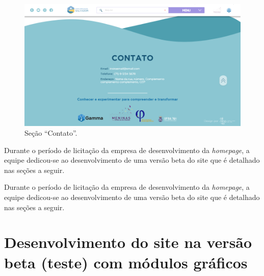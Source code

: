 \documentclass[
]{book}
\begin{document}
\begin{figure}
\includegraphics[width=13.33in]{images/image90} \caption{Seção “Contato”.}\label{fig:contatorecossa}
\end{figure}

Durante o período de licitação da empresa de desenvolvimento da \emph{homepage}, a equipe dedicou-se ao desenvolvimento de uma versão beta do site que é detalhado nas seções a seguir.

Durante o período de licitação da empresa de desenvolvimento da \emph{homepage}, a equipe dedicou-se ao desenvolvimento de uma versão beta do site que é detalhado nas seções a seguir.

\hypertarget{desenvolvimento-do-site-na-versuxe3o-beta-teste-com-muxf3dulos-gruxe1ficos}{%
\section{Desenvolvimento do site na versão beta (teste) com módulos gráficos}\label{desenvolvimento-do-site-na-versuxe3o-beta-teste-com-muxf3dulos-gruxe1ficos}}
\end{document}
